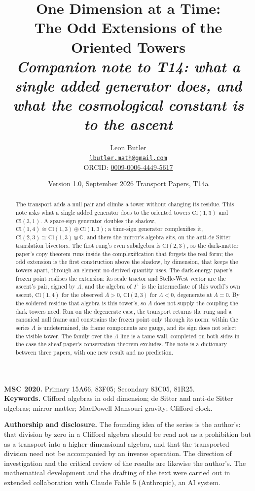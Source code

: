 \documentclass[11pt]{article}
\title{\bfseries One Dimension at a Time:\\ The Odd Extensions of the Oriented Towers\\[4pt]
  \large\itshape Companion note to T14: what a single added generator does, and what the cosmological constant is to the ascent}
\author{Leon Butler\\ \normalsize\href{mailto:lbutler.math@gmail.com}{\texttt{lbutler.math@gmail.com}}\\ \normalsize ORCID: \href{https://orcid.org/0009-0006-4449-5617}{0009-0006-4449-5617}}
\date{Version 1.0, September 2026 \textperiodcentered{} Transport Papers, T14a}
\theoremstyle{definition}
\newcommand{\Cl}{\mathrm{Cl}}
\newcommand{\C}{\mathbb{C}}
\begin{document}
\maketitle

\begin{abstract}
\normalsize
The transport adds a null pair and climbs a tower without changing its residue. This note asks what a single added generator does to the oriented towers $\Cl(1,3)$ and $\Cl(3,1)$. A space-sign generator doubles the shadow, $\Cl(1,4) \cong \Cl(1,3) \oplus \Cl(1,3)$; a time-sign generator complexifies it, $\Cl(2,3) \cong \Cl(1,3) \otimes \C$, and there the mirror's algebra sits, on the anti-de Sitter translation bivectors. The first rung's even subalgebra is $\Cl(2,3)$, so the dark-matter paper's copy theorem runs inside the complexification that forgets the real form; the odd extension is the first construction above the shadow, by dimension, that keeps the towers apart, through an element no derived quantity uses. The dark-energy paper's frozen point realises the extension: its scale tractor and Stelle-West vector are the ascent's pair, signed by $\Lambda$, and the algebra of $I^{\perp}$ is the intermediate of this world's own ascent, $\Cl(1,4)$ for the observed $\Lambda > 0$, $\Cl(2,3)$ for $\Lambda < 0$, degenerate at $\Lambda = 0$. By the soldered residue that algebra is this tower's, so $\Lambda$ does not supply the coupling the dark towers need. Run on the degenerate case, the transport returns the rung and a canonical null frame and constrains the frozen point only through its norm: within the series $\Lambda$ is undetermined, its frame components are gauge, and its sign does not select the visible tower. The family over the $\Lambda$ line is a tame wall, completed on both sides in the case the sheaf paper's conservation theorem excludes. The note is a dictionary between three papers, with one new result and no prediction.
\end{abstract}

\medskip
\noindent\textbf{MSC 2020.} Primary 15A66, 83F05; Secondary 83C05, 81R25.\\
\textbf{Keywords.} Clifford algebras in odd dimension; de Sitter and anti-de Sitter algebras; mirror matter; MacDowell-Mansouri gravity; Clifford clock.

\newpage
\textbf{Authorship and disclosure. }The founding idea of the series is the author's: that division by zero in a Clifford algebra should be read not as a prohibition but as a transport into a higher-dimensional algebra, and that the transported division need not be accompanied by an inverse operation. The direction of investigation and the critical review of the results are likewise the author's. The mathematical development and the drafting of the text were carried out in extended collaboration with Claude Fable 5 (Anthropic), an AI system.
\end{document}
